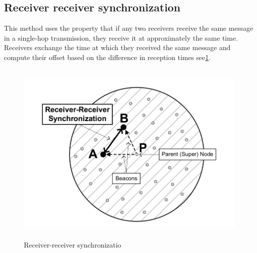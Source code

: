     \subsection{Receiver receiver synchronization}
	    This method uses the property that if any two receivers receive the same message in a single-hop transmission, they receive it at approximately the same time. Receivers exchange the time at which they received the same message and compute their offset based on the difference in reception times\cite{book} see\ref{fig:x Receiver_to_receiver}.
	     \begin{figure}[h!]
	    	\centering
	    	\includegraphics[scale=0.5,width=15cm,height=9cm]{photos/receiver_receiver.png}
	    	\caption{Receiver-receiver synchronizatio}
	    	\label{fig:x Receiver_to_receiver}
	    	
	    \end{figure}
    
    
    
